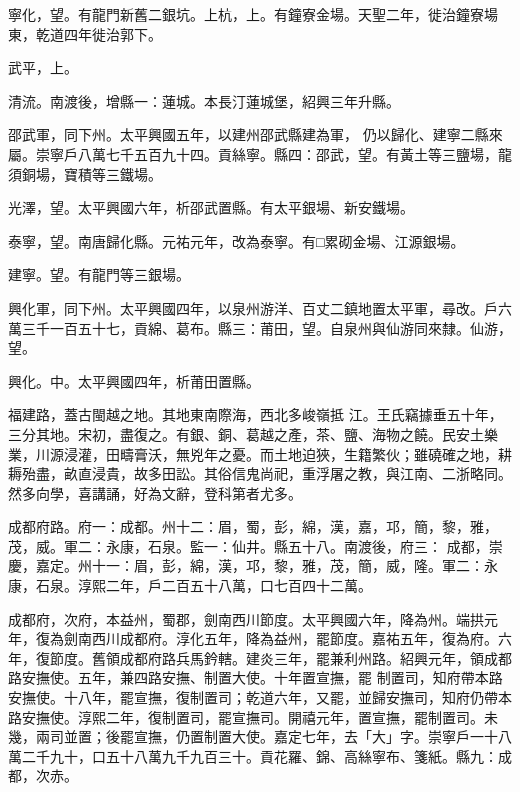 \begin{pinyinscope}
 寧化，望。有龍門新舊二銀坑。上杭，上。有鐘寮金場。天聖二年，徙治鐘寮場東，乾道四年徙治郭下。



 武平，上。



 清流。南渡後，增縣一：蓮城。本長汀蓮城堡，紹興三年升縣。



 邵武軍，同下州。太平興國五年，以建州邵武縣建為軍，
 仍以歸化、建寧二縣來屬。崇寧戶八萬七千五百九十四。貢絲寧。縣四：邵武，望。有黃土等三鹽場，龍須銅場，寶積等三鐵場。



 光澤，望。太平興國六年，析邵武置縣。有太平銀場、新安鐵場。



 泰寧，望。南唐歸化縣。元祐元年，改為泰寧。有□累砌金場、江源銀場。



 建寧。望。有龍門等三銀場。



 興化軍，同下州。太平興國四年，以泉州游洋、百丈二鎮地置太平軍，尋改。戶六萬三千一百五十七，貢綿、葛布。縣三：莆田，望。自泉州與仙游同來隸。仙游，望。



 興化。中。太平興國四年，析莆田置縣。



 福建路，蓋古閩越之地。其地東南際海，西北多峻嶺抵
 江。王氏竊據垂五十年，三分其地。宋初，盡復之。有銀、銅、葛越之產，茶、鹽、海物之饒。民安土樂業，川源浸灌，田疇膏沃，無兇年之憂。而土地迫狹，生籍繁伙；雖磽確之地，耕耨殆盡，畝直浸貴，故多田訟。其俗信鬼尚祀，重浮屠之教，與江南、二浙略同。然多向學，喜講誦，好為文辭，登科第者尤多。



 成都府路。府一：成都。州十二：眉，蜀，彭，綿，漢，嘉，邛，簡，黎，雅，茂，威。軍二：永康，石泉。監一：仙井。縣五十八。南渡後，府三：
 成都，崇慶，嘉定。州十一：眉，彭，綿，漢，邛，黎，雅，茂，簡，威，隆。軍二：永康，石泉。淳熙二年，戶二百五十八萬，口七百四十二萬。



 成都府，次府，本益州，蜀郡，劍南西川節度。太平興國六年，降為州。端拱元年，復為劍南西川成都府。淳化五年，降為益州，罷節度。嘉祐五年，復為府。六年，復節度。舊領成都府路兵馬鈐轄。建炎三年，罷兼利州路。紹興元年，領成都路安撫使。五年，兼四路安撫、制置大使。十年置宣撫，罷
 制置司，知府帶本路安撫使。十八年，罷宣撫，復制置司；乾道六年，又罷，並歸安撫司，知府仍帶本路安撫使。淳熙二年，復制置司，罷宣撫司。開禧元年，置宣撫，罷制置司。未幾，兩司並置；後罷宣撫，仍置制置大使。嘉定七年，去「大」字。崇寧戶一十八萬二千九十，口五十八萬九千九百三十。貢花羅、錦、高絲寧布、箋紙。縣九：成都，次赤。




\end{pinyinscope}
